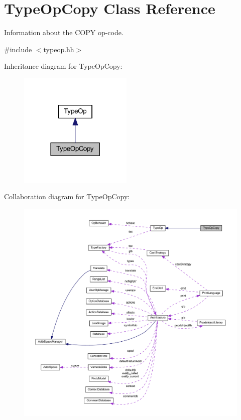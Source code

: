 \hypertarget{class_type_op_copy}{}\section{Type\+Op\+Copy Class Reference}
\label{class_type_op_copy}


Information about the C\+O\+PY op-\/code.  




{\ttfamily \#include $<$typeop.\+hh$>$}



Inheritance diagram for Type\+Op\+Copy\+:
\nopagebreak
\begin{figure}[H]
\begin{center}
\leavevmode
\includegraphics[width=153pt]{class_type_op_copy__inherit__graph}
\end{center}
\end{figure}


Collaboration diagram for Type\+Op\+Copy\+:
\nopagebreak
\begin{figure}[H]
\begin{center}
\leavevmode
\includegraphics[width=350pt]{class_type_op_copy__coll__graph}
\end{center}
\end{figure}
